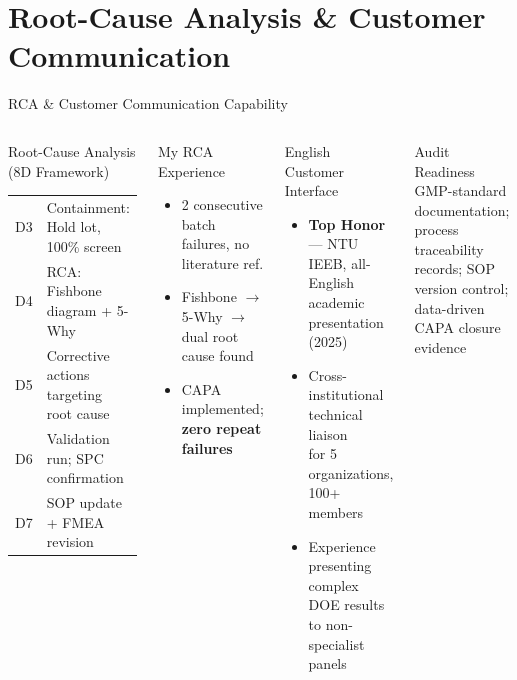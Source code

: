 \documentclass[aspectratio=169,10pt]{beamer}
\begin{document}
\section{Root-Cause Analysis \& Customer Communication}
\begin{frame}{RCA \& Customer Communication Capability}
  \begin{columns}[T]
      \begin{block}{Root-Cause Analysis (8D Framework)}
        \footnotesize
        \begin{tabular}{p{0.5cm}p{4.5cm}}
          \toprule
          D3 & Containment: Hold lot, 100\% screen \\
          D4 & RCA: Fishbone diagram + 5-Why \\
          D5 & Corrective actions targeting root cause \\
          D6 & Validation run; SPC confirmation \\
          D7 & SOP update + FMEA revision \\
          \bottomrule
        \end{tabular}
      \end{block}
      \vspace{0.1cm}
      \begin{block}{My RCA Experience}
        \small
        \begin{itemize}
          \item 2 consecutive batch failures, no literature ref.
          \item Fishbone $\to$ 5-Why $\to$ dual root cause found
          \item CAPA implemented; \textbf{zero repeat failures}
        \end{itemize}
      \end{block}

      \begin{block}{English Customer Interface}
        \small
        \begin{itemize}
          \item \textbf{Top Honor} — NTU IEEB, all-English\\
                academic presentation (2025)
          \item Cross-institutional technical liaison\\
                for 5 organizations, 100+ members
          \item Experience presenting complex\\
                DOE results to non-specialist panels
        \end{itemize}
      \end{block}
      \vspace{0.1cm}
      \begin{exampleblock}{Audit Readiness}
        \footnotesize
        GMP-standard documentation; process\\
        traceability records; SOP version control;\\
        data-driven CAPA closure evidence
      \end{exampleblock}
  \end{columns}
\end{frame}
\end{document}

